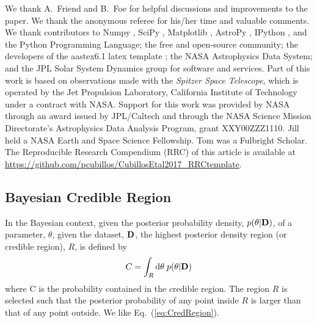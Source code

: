 \acknowledgments

We thank A.\ Friend and B.\ Foe for helpful discussions and
improvements to the paper.  We thank the anonymous referee for his/her
time and valuable comments.  We thank contributors to Numpy
\citep{vanderWaltEtal2011numpy}, SciPy \citep{JonesEtal2001scipy},
Matplotlib \citep{Hunter2007ieeeMatplotlib}, AstroPy
\citep{Astropy2013aaAstroPy}, IPython \citep{PerezGranger2007ipython},
and the Python Programming Language; the
free and open-source community; the developers of the aastex6.1 latex
template \citep{AASteam2016aastex61}; the NASA Astrophysics Data System;
and the JPL Solar System Dynamics group for software and services.
Part of this work is based on observations made with the {\em Spitzer
  Space Telescope}, which is operated by the Jet Propulsion
Laboratory, California Institute of Technology under a contract with
NASA.  Support for this work was provided by NASA through an award
issued by JPL/Caltech and through the NASA Science Mission
Directorate's Astrophysics Data Analysis Program, grant XXY00ZZZ1110.
Jill held a NASA Earth and Space Science Fellowship.  Tom was a
Fulbright Scholar.  The Reproducible Research Compendium (RRC) of this
article is available at \href{http://tinyurl.com/2fcpre6}
{https://github.com/pcubillos/CubillosEtal2017\_RRCtemplate}.



\begin{appendices}

\section{Bayesian Credible Region}
\label{sec:CredRegion}

In the Bayesian context, given the posterior probability density,
$p(\theta|{\bf D})$, of a parameter, $\theta$, given the dataset,
${\bf D}$, the highest posterior density region (or credible
region), $R$, is defined by
\begin{equation}
C = \int\sb{R} {\rm d}\theta\;p(\theta|{\bf D})
\label{eq:CredRegion}
\end{equation}
where C is the probability contained in the credible region.  The
region $R$ is selected such that the posterior probability of any
point inside $R$ is larger than that of any point outside.  We like
Eq.\ (\ref{eq:CredRegion}).

\end{appendices}


